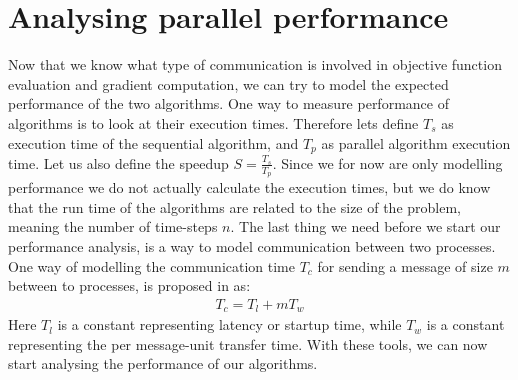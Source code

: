 \section{Analysing parallel performance} \label{analysis sec}
Now that we know what type of communication is involved in objective function evaluation and gradient computation, we can try to model the expected performance of the two algorithms. One way to measure performance of algorithms is to look at their execution times. Therefore lets define $T_s$ as execution time of the sequential algorithm, and $T_p$ as parallel algorithm execution time. Let us also define the speedup $S=\frac{T_s}{T_p}$. Since we for now are only modelling performance we do not actually calculate the execution times, but we do know that the run time of the algorithms are related to the size of the problem, meaning the number of time-steps $n$. The last thing we need before we start our performance analysis, is a way to model communication between two processes. One way of modelling the communication time $T_c$ for sending a message of size $m$ between to processes, is proposed in \cite{grama2003introduction} as:
\begin{align*}
T_c = T_l + mT_w
\end{align*} 
Here $T_l$ is a constant representing latency or startup time, while $T_w$ is a constant representing the per message-unit transfer time. With these tools, we can now start analysing the performance of our algorithms.
